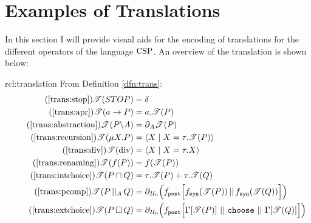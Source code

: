 \documentclass[../hons_project.tex]{subfiles}
\begin{document}
\section{Examples of Translations}
In this section I will provide visual aids for the encoding of translations for the different operators of the language $\mathrm{CSP}$. An overview of the translation is shown below:

\begin{rcl}[Translation]{rcl:translation}{}
	From Definition \ref{dfn:trans}:
	\begin{align}
		\tag{\ref{trans:stop}}
		\trans{STOP}& = \delta\\
		\tag{\ref{trans:apr}}
		\trans{a \to P}        & = a.\trans{P}                                                                                                                                                                                \\
		\tag{\ref{trans:abstraction}}
		\trans{P \backslash A} & = \partial_{A}{\trans{P}}                                                                                                                                                                    \\
		\tag{\ref{trans:recursion}}
		\trans{\mu X.P} &= \langle X \mid X = \tau.\trans{P} \rangle \\
		\tag{\ref{trans:div}}
		\trans{\mathrm{div}}   & = \langle X \mid X = \tau.X \rangle                                                                                                                                                          \\
		\tag{\ref{trans:renaming}}
		\trans{f(P)}           & = f(\trans{P})                                                                                                                                                                               \\
		\tag{\ref{trans:intchoice}}
		\trans{P \intchoice Q} & = \tau.\trans{P} + \tau.\trans{Q}                                                                                                                                                            \\
		\tag{\ref{trans:pcomp}}
		\trans{P \pcomp Q}     & = \partial_{H_{0}}\Bigl(\fdef{post}\Bigl[\fdef{syn}(\trans{P}) \merge \fdef{syn}(\trans{Q})\Bigr]\Bigr)                                                                                      \\
		\tag{\ref{trans:extchoice}}
		\trans{P \extchoice Q} & = \partial_{H_{0}}\Bigl(\fdef{post}\Bigl[\Gamma[\trans{P}]\, \merge \,\mathtt{choose}\, \merge \,\Gamma[\trans{Q}]\Bigl]\Bigr)                                                               \\

\end{align}
\end{rcl}
\end{document}
